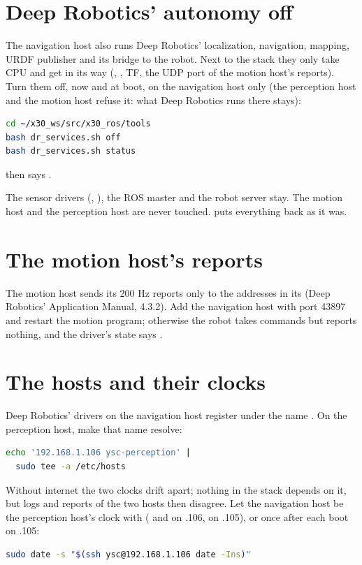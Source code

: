 \section{Deep Robotics' autonomy off}
\label{sec:i-dr}

The navigation host also runs Deep Robotics' localization, navigation, mapping, URDF publisher
and its bridge to the robot. Next to the stack they only take CPU and get in its way
(, , TF, the UDP port of the motion host's reports). Turn them
off, now and at boot, on the navigation host only (the perception host and the motion host
refuse it: what Deep Robotics runs there stays):

\begin{lstlisting}[language=bash]
cd ~/x30_ws/src/x30_ros/tools
bash dr_services.sh off
bash dr_services.sh status
\end{lstlisting}

 then says .

The sensor drivers (, ), the ROS master and the robot
server stay. The motion host and the perception host are never touched. 
puts everything back as it was.

\section{The motion host's reports}
\label{sec:i-networktoml}

The motion host sends its 200 Hz reports only to the addresses in its 
(Deep Robotics' Application Manual, 4.3.2). Add the navigation host with port 43897 and restart
the motion program; otherwise the robot takes commands but reports nothing, and the driver's
state says .

\section{The hosts and their clocks}

Deep Robotics' drivers on the navigation host register under the name .
On the perception host, make that name resolve:

\begin{lstlisting}[language=bash]
echo '192.168.1.106 ysc-perception' |
  sudo tee -a /etc/hosts
\end{lstlisting}

Without internet the two clocks drift apart; nothing in the stack depends on it, but logs and
reports of the two hosts then disagree. Let the navigation host be the perception host's clock
with  ( and  on .106,
 on .105), or once after each boot on .105:

\begin{lstlisting}[language=bash]
sudo date -s "$(ssh ysc@192.168.1.106 date -Ins)"
\end{lstlisting}
